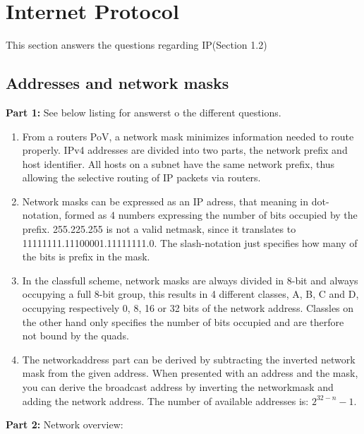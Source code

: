 \section{Internet Protocol}
This section answers the questions regarding IP(Section 1.2)

\subsection{Addresses and network masks}
\textbf{Part 1: } See below listing for answerst o the different questions.

\begin{enumerate}
\item From a routers PoV, a network mask minimizes information needed to route properly.
    IPv4 addresses are divided into two parts, the network prefix and host identifier.
    All hosts on a subnet have the same network prefix, thus allowing the selective routing
    of IP packets via routers.
\item Network masks can be expressed as an IP adress, that meaning in
    dot-notation, formed as 4 numbers expressing the number of bits occupied by the
    prefix. 255.225.255 is not a valid netmask, since it translates to
    11111111.11100001.11111111.0. The slash-notation just specifies how many of the
    bits is prefix in the mask.
\item In the classfull scheme, network masks are always divided in 8-bit and
    always occupying a full 8-bit group, this results in 4 different classes, A, B,
    C and D, occupying respectively 0, 8, 16 or 32 bits of the network address.
    Classles on the other hand only specifies the number of bits occupied and are
    therfore not bound by the quads.
\item The networkaddress part can be derived by subtracting the inverted
    network mask from the given address. When presented with an address and the 
    mask, you can derive the broadcast address by inverting the networkmask and 
    adding the network address. The number of available addresses is: 
    $2^{32 - n}-1$.
\end{enumerate}

\textbf{Part 2: } Network overview:


